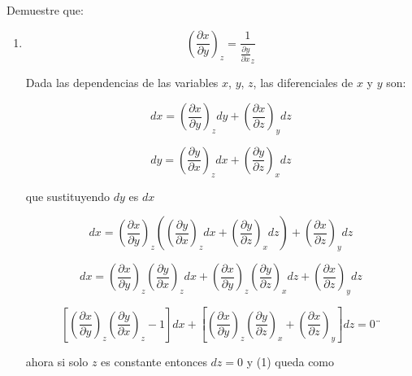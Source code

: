 \documentclass[12pt,a4paper]{article}
\begin{document}
\begin{enumerate}
    Demuestre que:
    
    \begin{enumerate}
        
    \item \begin{equation*}
        \left(\frac{\partial x}{\partial y}\right)_z = \frac{1}{\frac{\partial y}{\partial x}_z}
    \end{equation*}
    
    Dada las dependencias de las variables $x$, $y$, $z$, las diferenciales de $x$ y $y$ son:
    
    \begin{equation*}
        dx = \left(\frac{\partial x}{\partial y}\right)_z dy + \left(\frac{\partial x}{\partial z}\right)_y dz
    \end{equation*}
    
    
    \begin{equation*}
        dy = \left(\frac{\partial y}{ \partial x}\right)_z dx + \left(\frac{\partial y}{\partial z}\right)_x dz
    \end{equation*}
    
    que sustituyendo $dy$ es $dx$ 
    
    \begin{equation*}
        dx = \left(\frac{\partial x}{\partial y}\right)_z \left(\left(\frac{\partial y}{ \partial x}\right)_z dx + \left(\frac{\partial y}{\partial z}\right)_x dz\right) + \left(\frac{\partial x}{\partial z}\right)_y dz
    \end{equation*}
    
    \begin{equation*}
        dx = \left(\frac{\partial x}{\partial y}\right)_z \left(\frac{\partial y}{ \partial x}\right)_z dx + \left(\frac{\partial x}{\partial y}\right)_z\left(\frac{\partial y}{\partial z}\right)_x dz + \left(\frac{\partial x}{\partial z}\right)_y dz
    \end{equation*}
    
    
    \begin{equation}
        \left[\left(\frac{\partial x}{\partial y}\right)_z \left(\frac{\partial y}{\partial x}\right)_z -1\right] dx + \left[\left(\frac{\partial x}{\partial y}\right)_z \left(\frac{\partial y}{\partial z}\right)_x + \left(\frac{\partial x}{\partial z}\right)_y\right] dz = 0¨
    \end{equation}
    
    ahora si solo $z$ es constante entonces $dz = 0$ y (1) queda como
    

\end{enumerate}
\end{enumerate}
\end{document}
